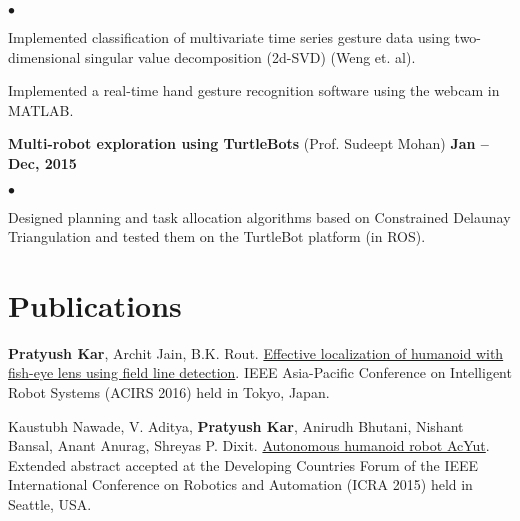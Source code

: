 \documentclass[margin,line]{res}
\newenvironment{list2}{
  \begin{list}{$\bullet$}{%
      \setlength{\itemsep}{0in}
      \setlength{\parsep}{0in} \setlength{\parskip}{0in}
      \setlength{\topsep}{0in} \setlength{\partopsep}{0in} 
      \setlength{\leftmargin}{0.2in}}}{\end{list}}
\begin{document}
\begin{resume}
\vspace*{.2cm}
\begin{list2}
\item Implemented classification of multivariate time series gesture data using two-dimensional singular value decomposition (2d-SVD) (Weng et. al).
\item Implemented a real-time hand gesture recognition software using the webcam in MATLAB.	
\end{list2}

%

\begin{minipage}{\linewidth}
{\bf Multi-robot exploration using TurtleBots} (Prof. Sudeept Mohan) \hfill {\bf Jan -- Dec, 2015}

\vspace*{.2cm}
\begin{list2}
\item Designed planning and task allocation algorithms based on Constrained Delaunay Triangulation and tested them on the TurtleBot platform (in ROS).
\end{list2}

\end{minipage}


\section{\sc Publications}

{\bf Pratyush Kar}, Archit Jain, B.K. Rout. \href{http://dx.doi.org/10.1109/ACIRS.2016.7556191}{Effective localization of humanoid with fish-eye lens using field line detection}. IEEE Asia-Pacific Conference on Intelligent Robot Systems (ACIRS 2016) held in Tokyo, Japan.

Kaustubh Nawade, V. Aditya, {\bf Pratyush Kar}, Anirudh Bhutani, Nishant Bansal, Anant Anurag, Shreyas P. Dixit. \href{https://p-kar.github.io/files/ICRA15.pdf}{Autonomous humanoid robot AcYut}. Extended abstract accepted at the Developing Countries Forum of the IEEE International Conference on Robotics and Automation (ICRA 2015) held in Seattle, USA.


\end{resume}
\end{document}
